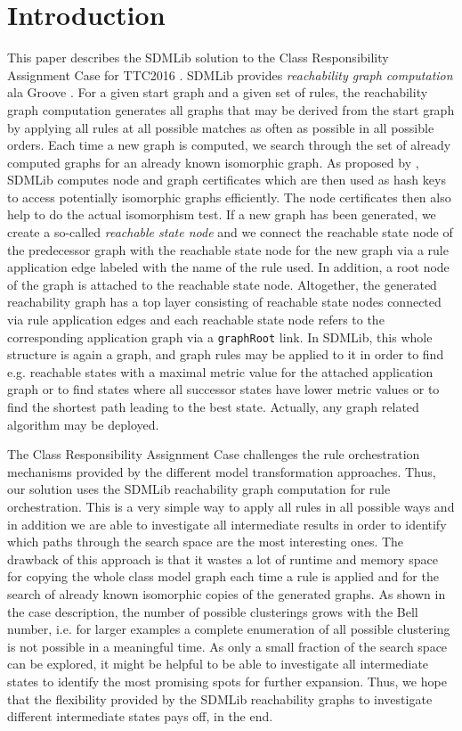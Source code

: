 \documentclass[submission,copyright,creativecommons]{eptcs}
\begin{document}
\section{Introduction}
\label{sec:intro}

This paper describes the SDMLib solution to the Class Responsibility Assignment Case for TTC2016
\cite{ttc2016-case}. SDMLib provides \emph{reachability graph computation} ala Groove 
\cite{rensink2003groove}. For a given start graph and a given set of rules, 
the reachability graph computation generates all graphs that may be derived from 
the start graph by applying all rules at all 
possible matches as often as possible in all possible orders. Each time a new 
graph is 
computed, we search through the set of already computed graphs for an already known 
isomorphic graph. As proposed by \cite{rensink2003groove}, SDMLib computes node and graph 
certificates which are then used as hash keys to access potentially isomorphic 
graphs efficiently. The node certificates then also help to do the actual 
isomorphism test. If a new 
graph has been generated, we create a so-called \emph{reachable state 
node} and we connect the reachable state node of the predecessor graph with the reachable 
state node for the new graph via a rule application edge labeled with the name of 
the rule used. In addition, a root node of the graph is attached to the reachable state node. 
Altogether, the generated reachability graph has a top layer consisting of reachable 
state nodes connected via rule application edges and each reachable state node refers to 
the corresponding application graph via a \texttt{graphRoot} link. In SDMLib, this whole 
structure is again a graph, and graph rules may be applied to it in order to find e.g. 
reachable states with a maximal metric value for the attached application graph 
or to find states 
where all successor states have lower metric values or to find the shortest path leading to 
the best state. Actually, any graph related algorithm may be deployed.  

The Class Responsibility Assignment Case challenges the rule orchestration mechanisms 
provided by the different model transformation approaches. Thus, our solution uses the SDMLib 
reachability graph computation for rule orchestration. This is a very simple way to apply 
all rules in all possible ways and in addition we are able to investigate all intermediate 
results in order to identify which paths through the search space are the most interesting 
ones. The drawback of this approach is that it wastes a lot of runtime and memory space 
for copying the whole class model graph each time a rule is applied and for the search of 
already known isomorphic copies of the generated graphs. As shown in the case 
description, the number of possible clusterings grows with the Bell number, i.e. 
for larger examples a complete enumeration of all possible clustering is not possible in a 
meaningful time. As only a small fraction of the search space can be explored, it might be 
helpful to be able to investigate all intermediate states to identify the most promising spots 
for further expansion. Thus, we hope that the flexibility provided by the SDMLib reachability 
graphs to investigate different intermediate states pays off, in the end. 
\end{document}
